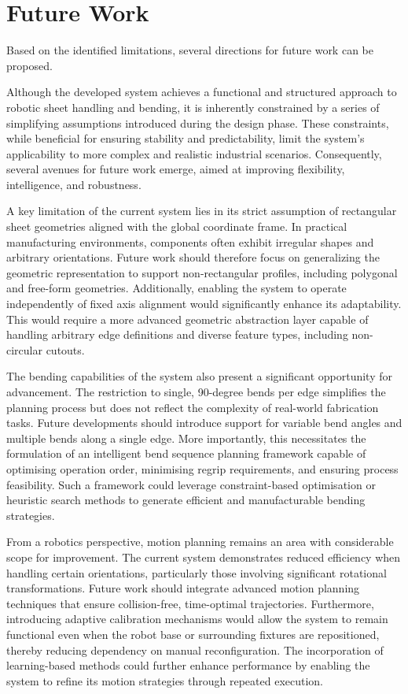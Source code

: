 \section{Future Work}
\label{sec:future-work}

Based on the identified limitations, several directions for future work can be proposed.

Although the developed system achieves a functional and structured approach to robotic sheet handling and bending, it is inherently constrained by a series of simplifying assumptions introduced during the design phase. These constraints, while beneficial for ensuring stability and predictability, limit the system's applicability to more complex and realistic industrial scenarios. Consequently, several avenues for future work emerge, aimed at improving flexibility, intelligence, and robustness.

A key limitation of the current system lies in its strict assumption of rectangular sheet geometries aligned with the global coordinate frame. In practical manufacturing environments, components often exhibit irregular shapes and arbitrary orientations. Future work should therefore focus on generalizing the geometric representation to support non-rectangular profiles, including polygonal and free-form geometries. Additionally, enabling the system to operate independently of fixed axis alignment would significantly enhance its adaptability. This would require a more advanced geometric abstraction layer capable of handling arbitrary edge definitions and diverse feature types, including non-circular cutouts.

The bending capabilities of the system also present a significant opportunity for advancement. The restriction to single, 90-degree bends per edge simplifies the planning process but does not reflect the complexity of real-world fabrication tasks. Future developments should introduce support for variable bend angles and multiple bends along a single edge. More importantly, this necessitates the formulation of an intelligent bend sequence planning framework capable of optimising operation order, minimising regrip requirements, and ensuring process feasibility. Such a framework could leverage constraint-based optimisation or heuristic search methods to generate efficient and manufacturable bending strategies.

From a robotics perspective, motion planning remains an area with considerable scope for improvement. The current system demonstrates reduced efficiency when handling certain orientations, particularly those involving significant rotational transformations. Future work should integrate advanced motion planning techniques that ensure collision-free, time-optimal trajectories. Furthermore, introducing adaptive calibration mechanisms would allow the system to remain functional even when the robot base or surrounding fixtures are repositioned, thereby reducing dependency on manual reconfiguration. The incorporation of learning-based methods could further enhance performance by enabling the system to refine its motion strategies through repeated execution.

